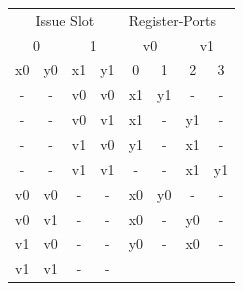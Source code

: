 \begin{table}[htbp]
	\centering
	\begin{minipage}{\textwidth}
	\centering
	\begin{tabular}{cccccccc}
		\multicolumn{4}{c}{Issue Slot}                 & \multicolumn{4}{|l}{Register-Ports}                                                               \\ 
		\multicolumn{2}{c}{0} & \multicolumn{2}{|c}{1} & \multicolumn{2}{|c}{v0} & 
		\multicolumn{2}{|c}{v1} \\
		\multicolumn{1}{c}{x0} & \multicolumn{1}{c}{y0} &
		\multicolumn{1}{|c}{x1} & \multicolumn{1}{c}{y1} &
		\multicolumn{1}{|c}{0} & \multicolumn{1}{c}{1} & \multicolumn{1}{|c}{2} & \multicolumn{1}{c}{3} \\
		\hline
		\multicolumn{1}{c}{-} & \multicolumn{1}{c}{-} &
		\multicolumn{1}{c}{v0} & \multicolumn{1}{c}{v0} &
		\multicolumn{1}{|c}{x1} & \multicolumn{1}{c}{y1} & \multicolumn{1}{c}{-} & \multicolumn{1}{c}{-} \\ 
		\multicolumn{1}{c}{-} & \multicolumn{1}{c}{-} &
		\multicolumn{1}{c}{v0} & \multicolumn{1}{c}{v1} &
		\multicolumn{1}{|c}{x1} & \multicolumn{1}{c}{-} & \multicolumn{1}{c}{y1} & \multicolumn{1}{c}{-} \\ 
		\multicolumn{1}{c}{-} & \multicolumn{1}{c}{-} &
		\multicolumn{1}{c}{v1} & \multicolumn{1}{c}{v0} &
		\multicolumn{1}{|c}{y1} & \multicolumn{1}{c}{-} & \multicolumn{1}{c}{x1} & \multicolumn{1}{c}{-} \\ 
		\multicolumn{1}{c}{-} & \multicolumn{1}{c}{-} &
		\multicolumn{1}{c}{v1} & \multicolumn{1}{c}{v1} &
		\multicolumn{1}{|c}{-} & \multicolumn{1}{c}{-} & \multicolumn{1}{c}{x1} &  \multicolumn{1}{c}{y1} \\
		\multicolumn{1}{c}{v0} & \multicolumn{1}{c}{v0} &
		\multicolumn{1}{c}{-} & \multicolumn{1}{c}{-} &
		\multicolumn{1}{|c}{x0} & \multicolumn{1}{c}{y0} & \multicolumn{1}{c}{-} & \multicolumn{1}{c}{-} \\ 
		\multicolumn{1}{c}{v0} & \multicolumn{1}{c}{v1} &
		\multicolumn{1}{c}{-} & \multicolumn{1}{c}{-} &
		\multicolumn{1}{|c}{x0} & \multicolumn{1}{c}{-} & \multicolumn{1}{c}{y0} & \multicolumn{1}{c}{-} \\ 
		\multicolumn{1}{c}{v1} & \multicolumn{1}{c}{v0} &
		\multicolumn{1}{c}{-} & \multicolumn{1}{c}{-} &
		\multicolumn{1}{|c}{y0} & \multicolumn{1}{c}{-} & \multicolumn{1}{c}{x0} & \multicolumn{1}{c}{-} \\ 
		\multicolumn{1}{c}{v1} & \multicolumn{1}{c}{v1} &
		\multicolumn{1}{c}{-} & \multicolumn{1}{c}{-} &

\end{tabular}
\end{minipage}
\end{table}
